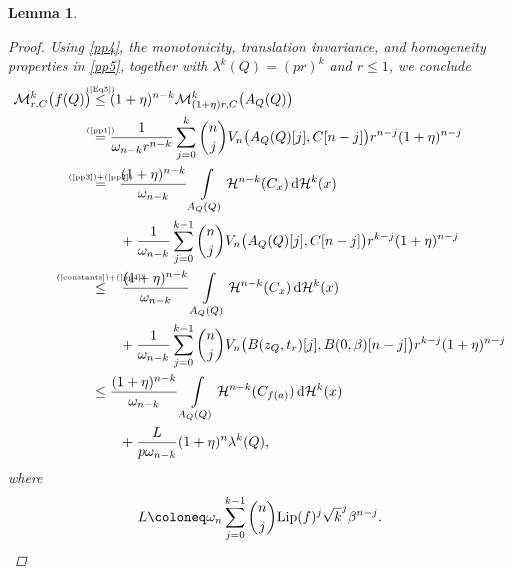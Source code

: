 \documentclass[pdflatex,sn-mathphys-num]{sn-jnl}
\theoremstyle{plain}
\newtheorem{lemma}[theorem]{Lemma}
\theoremstyle{definition}
\newcommand{\dH}[1]{\,\mathrm d\mathcal{H}^{#1}}
\begin{document}
\begin{lemma}
\begin{proof}
Using \eqref{pp4}, the monotonicity, translation invariance, and homogeneity properties in \eqref{pp5}, together with $\lambda^k(Q)=(pr)^k$ and $r\leq1$, we conclude  \newcommand\myeqhuhuj{\mathrel{\stackrel{\makebox[0pt]{\mbox{\normalfont\tiny (\ref{Eq5})}}}{\leq}}}\newcommand\myeqhuhujuj{\mathrel{\stackrel{\makebox[0pt]{\mbox{\normalfont\tiny (\ref{pp1})}}}{=}}}\newcommand\myeqhuhujujuj{\mathrel{\stackrel{\makebox[0pt]{\mbox{\normalfont\tiny (\ref{pp3})+(\ref{pp2})}}}{=}}}\newcommand\myeqhuhujujujuj{\mathrel{\stackrel{\makebox[0pt]{\mbox{\normalfont\tiny (\ref{constants})+(\ref{pp4})}}}{\leq}}}\begin{equation}\label{Eq1}
    \begin{split}
        \mathcal{M}^k_{r, C}\big(f(Q)\big)&\myeqhuhuj (1+\eta)^{n-k}\mathcal{M}^k_{(1+\eta)r, C}\big(A_Q(Q)\big)\\&\myeqhuhujuj\frac{1}{\omega_{n-k} r^{n-k}}\sum_{j=0}^k {n\choose j}V_n\big(A_Q(Q)[j], C[n-j]\big)r^{n-j}(1+\eta)^{n-j}\\&\myeqhuhujujuj\,\,\,\,\frac{(1+\eta)^{n-k}}{\omega_{n-k}}\int\limits_{A_Q(Q)}\mathcal{H}^{n-k}(C_x)\dH{k}(x)\\&\quad\quad+\frac{1}{\omega_{n-k}}\sum_{j=0}^{k-1} {n\choose j}V_n\big(A_Q(Q)[j], C[n-j]\big)r^{k-j}(1+\eta)^{n-j}\\&\myeqhuhujujujuj\,\,\,\,\,\frac{(1+\eta)^{n-k}}{\omega_{n-k}}\int\limits_{A_Q(Q)}\mathcal{H}^{n-k}(C_x)\dH{k}(x)\\&\quad\quad+\frac{1}{\omega_{n-k}}\sum_{j=0}^{k-1} {n\choose j}V_n\big(B(z_{Q}, t_r)[j], B(0, \beta)[n-j]\big)r^{k-j}(1+\eta)^{n-j}\\&\leq\frac{(1+\eta)^{n-k}}{\omega_{n-k}}\int\limits_{A_Q(Q)}\mathcal{H}^{n-k}(C_{f(a)})\dH{k}(x)\\&\quad\quad+\frac{L}{p\omega_{n-k}}(1+\eta)^{n}\lambda^k(Q),
    \end{split}
\end{equation} where $$L\coloneq\omega_{n}\sum_{j=0}^{k-1} {n\choose j}\textup{Lip}(f)^j\sqrt{k}^j\beta^{n-j}.$$



\end{proof}
\end{lemma}
\end{document}
